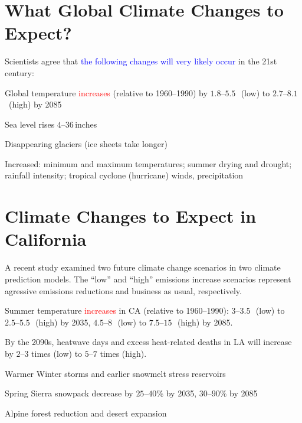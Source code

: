 \documentclass[12pt]{article}
\begin{document}
\section{What Global Climate Changes to Expect?}
Scientists agree that \textcolor{blue}{the following changes will very
  likely occur} in the 21st century:
\begin{itemize*}
\item Global temperature \textcolor{red}{increases} (relative to
  1960--1990) by $1.8\mbox{--}5.5$\,\dgrf\ (low) to
  $2.7\mbox{--}8.1$\,\dgrf\ (high) by 2085   
\item Sea level rises $4\mbox{--}36$\,inches
\item Disappearing glaciers (ice sheets take longer)
\item Increased: minimum and maximum temperatures; summer drying and drought;
rainfall intensity; tropical cyclone (hurricane) winds, precipitation
\end{itemize*}

\section{Climate Changes to Expect in California}
A recent study examined two future climate change scenarios in two
climate prediction models.
The ``low'' and ``high'' emissions increase scenarios represent
agressive emissions reductions and business as usual, respectively. 
\begin{itemize*}
\item Summer temperature \textcolor{red}{increases} in CA (relative to 1960--1990): 
$3\mbox{--}3.5$\,\dgrf\ (low) to $2.5\mbox{--}5.5$\,\dgrf\ (high) by 2035,
$4.5\mbox{--}8$\,\dgrf\ (low) to $7.5\mbox{--}15$\,\dgrf\ (high) by 2085.
\item By the 2090s, heatwave days and excess heat-related deaths in LA
  will increase by $2\mbox{--}3$ times (low) to $5\mbox{--}7$ times (high). 
\item Warmer Winter storms and earlier snowmelt stress reservoirs
\item Spring Sierra snowpack decrease by $25\mbox{--}40$\% by 2035,
  $30\mbox{--}90$\% by 2085 
\item Alpine forest reduction and desert expansion
\end{itemize*}
\end{document}

